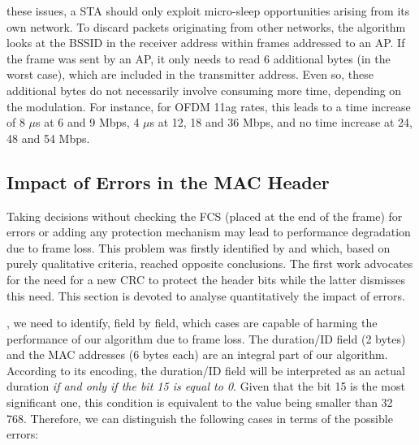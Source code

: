 \documentclass[twoside,nohyper]{tufte-book}
\theoremstyle{definition}
\theoremstyle{definition}
\theoremstyle{definition}
\theoremstyle{remark}
\begin{document}
 these issues, a STA should only
exploit micro-sleep opportunities arising from its own network. To
discard packets originating from other networks, the algorithm looks at
the BSSID in the receiver address within frames addressed to an AP. If
the frame was sent by an AP, it only needs to read 6 additional bytes
(in the worst case), which are included in the transmitter address. Even
so, these additional bytes do not necessarily involve consuming more
time, depending on the modulation. For instance, for OFDM 11ag rates,
this leads to a time increase of 8 \(\mu\)s at 6 and 9 Mbps, 4 \(\mu\)s
at 12, 18 and 36 Mbps, and no time increase at 24, 48 and 54 Mbps.

\hypertarget{impact-of-errors-in-the-mac-header}{%
\subsection{Impact of Errors in the MAC
Header}\label{impact-of-errors-in-the-mac-header}}

Taking decisions without checking the FCS (placed at the end of the
frame) for errors or adding any protection mechanism may lead to
performance degradation due to frame loss. This problem was firstly
identified by \citet{Balaji2010}\cite{Balaji2010} and
\citet{Prasad2014}\cite{Prasad2014} which, based on purely qualitative
criteria, reached opposite conclusions. The first work advocates for the
need for a new CRC to protect the header bits while the latter dismisses
this need. This section is devoted to analyse quantitatively the impact
of errors.

, we need to identify, field by field,
which cases are capable of harming the performance of our algorithm due
to frame loss. The duration/ID field (2 bytes) and the MAC addresses (6
bytes each) are an integral part of our algorithm. According to its
encoding, the duration/ID field will be interpreted as an actual
duration \emph{if and only if the bit 15 is equal to 0}. Given that the
bit 15 is the most significant one, this condition is equivalent to the
value being smaller than 32 768. Therefore, we can distinguish the
following cases in terms of the possible errors:
\end{document}
